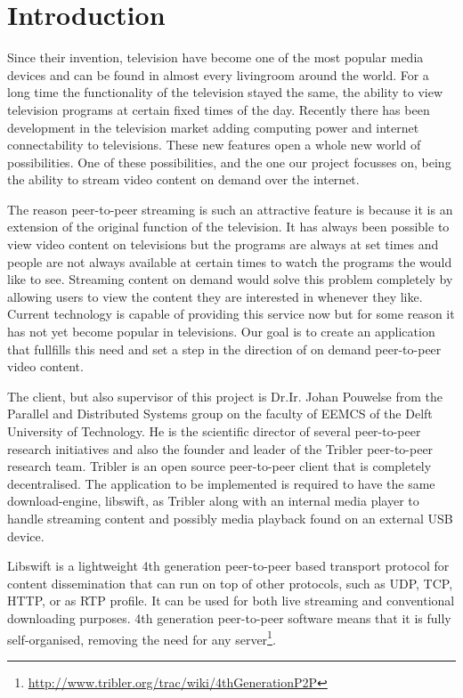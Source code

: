 \chapter{Introduction}
Since their invention, television have become one of the most popular media devices and can be found in almost every livingroom around the world. For a long time the functionality of the television stayed the same, the ability to view television programs at certain fixed times of the day. Recently there has been development in the television market adding computing power and internet connectability to televisions. These new features open a whole new world of possibilities. One of these possibilities, and the one our project focusses on, being the ability to stream video content on demand over the internet. 

The reason peer-to-peer streaming is such an attractive feature is because it is an extension of the original function of the television. It has always been possible to view video content on televisions but the programs are always at set times and people are not always available at certain times to watch the programs the would like to see. Streaming content on demand would solve this problem completely by allowing users to view the content they are interested in whenever they like. Current technology is capable of providing this service now but for some reason it has not yet become popular in televisions. Our goal is to create an application that fullfills this need and set a step in the direction of on demand peer-to-peer video content.

The client, but also supervisor of this project is Dr.Ir. Johan Pouwelse from the Parallel and Distributed Systems group on the faculty of EEMCS of the Delft University of Technology.
He is the scientific director of several peer-to-peer research initiatives and also the founder and leader of the Tribler peer-to-peer research team.
Tribler\cite{tribler} is an open source peer-to-peer client that is completely decentralised.
The application to be implemented is required to have the same download-engine, libswift,\cite{swift} as Tribler
along with an internal media player to handle streaming content and possibly media playback found on an external USB device.

Libswift is a lightweight 4th generation peer-to-peer based transport protocol for content dissemination
that can run on top of other protocols, such as UDP, TCP, HTTP, or as RTP profile.
It can be used for both live streaming and conventional downloading purposes.
4th generation peer-to-peer software means that it is fully self-organised, removing the need for any server\footnote{\url{http://www.tribler.org/trac/wiki/4thGenerationP2P}}.

